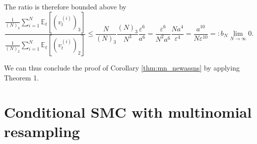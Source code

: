 \documentclass[fleqn]{article}
\theoremstyle{definition}
\newcommand{\E}{\mathbb{E}}
\newcommand{\1}[1]{\mathbbm{1}_{\{#1\}}}
\newcommand{\limNtoinfty}{\underset{N\to\infty}{\lim}}
\newcommand{\vt}[2][t]{v_{#1}^{(#2)}}
\begin{document}
The ratio is therefore bounded above by
\begin{equation*}
\frac{\frac{1}{(N)_3} \sum_{i=1}^N \E_t[(\vt{i})_3]}{\frac{1}{(N)_2} \sum_{i=1}^N \E_t[(\vt{i})_2]}
\leq \frac{N}{(N)_3} \frac{(N)_3}{N^3}\frac{\varepsilon^6}{a^6}
= \frac{\varepsilon^6}{N^2a^6} \frac{Na^4}{\varepsilon^4} = \frac{a^{10}}{N\varepsilon^{10}} =: b_N \limNtoinfty 0.
\end{equation*}

We can thus conclude the proof of Corollary \ref{thm:mn_newassns} by applying Theorem 1.


\section*{Conditional SMC with multinomial resampling}




\end{document}
